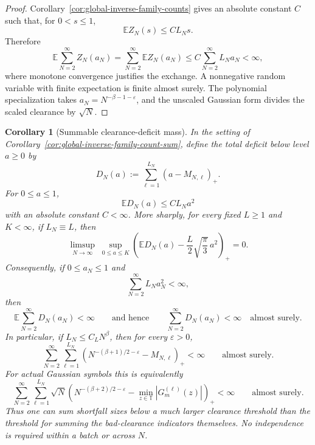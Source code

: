 \documentclass[11pt]{amsart}
\numberwithin{equation}{section}
\newtheorem{corollary}[theorem]{Corollary}
\theoremstyle{definition}
\theoremstyle{remark}
\newcommand{\T}{\mathbb T}
\newcommand{\Exp}{\mathbb E}
\newcommand{\eps}{\varepsilon}
\begin{document}
\begin{proof}
Corollary~\ref{cor:global-inverse-family-counts} gives an absolute constant
\(C\) such that, for \(0<s\le1\),
\[
  \Exp Z_N(s)\le CL_Ns .
\]
Therefore
\[
  \Exp\sum_{N=2}^\infty Z_N(a_N)
  =
  \sum_{N=2}^\infty \Exp Z_N(a_N)
  \le
  C\sum_{N=2}^\infty L_Na_N
  <\infty ,
\]
where monotone convergence justifies the exchange.  A nonnegative random
variable with finite expectation is finite almost surely.  The polynomial
specialization takes \(a_N=N^{-\beta-1-\eps}\), and the unscaled Gaussian form
divides the scaled clearance by \(\sqrt N\).
\end{proof}

\begin{corollary}[Summable clearance-deficit mass]
\label{cor:global-inverse-family-deficit-sum}
In the setting of Corollary~\ref{cor:global-inverse-family-count-sum}, define
the total deficit below level \(a\ge0\) by
\[
  D_N(a):=\sum_{\ell=1}^{L_N}(a-M_{N,\ell})_+ .
\]
For \(0\le a\le1\),
\[
  \Exp D_N(a)\le C L_Na^2
\]
with an absolute constant \(C<\infty\).  More sharply, for every fixed
\(L\ge1\) and \(K<\infty\), if \(L_N\equiv L\), then
\[
  \limsup_{N\to\infty}\;
  \sup_{0\le a\le K}
  \left(
    \Exp D_N(a)-\frac{L}{2}\sqrt{\frac{\pi}{3}}\,a^2
  \right)_+
  =0 .
\]
Consequently, if \(0\le a_N\le1\) and
\[
  \sum_{N=2}^\infty L_Na_N^2<\infty,
\]
then
\[
  \Exp\sum_{N=2}^\infty D_N(a_N)<\infty
  \qquad\text{and hence}\qquad
  \sum_{N=2}^\infty D_N(a_N)<\infty
  \quad\text{almost surely}.
\]
In particular, if \(L_N\le C_LN^\beta\), then for every \(\eps>0\),
\[
  \sum_{N=2}^\infty
  \sum_{\ell=1}^{L_N}
  \left(N^{-(\beta+1)/2-\eps}-M_{N,\ell}\right)_+
  <\infty
  \qquad\text{almost surely}.
\]
For actual Gaussian symbols this is equivalently
\[
  \sum_{N=2}^\infty
  \sum_{\ell=1}^{L_N}
  \sqrt N\left(
    N^{-(\beta+2)/2-\eps}
    -\min_{z\in\T}|G_m^{(\ell)}(z)|
  \right)_+
  <\infty
  \qquad\text{almost surely}.
\]
Thus one can sum shortfall sizes below a much larger clearance threshold than
the threshold for summing the bad-clearance indicators themselves.  No
independence is required within a batch or across \(N\).
\end{corollary}
\end{document}

